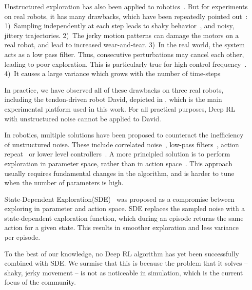 \documentclass{article}
\newcommand{\sde}{State-Dependent Exploration\xspace}
\newcommand{\SDE}{\textsc{SDE}\xspace}
\begin{document}
Unstructured exploration has also been applied to robotics~\citep{haarnoja2018applications, kendall2019learning}.
But for experiments on real robots, it has many drawbacks, which have been repeatedly pointed out~\citep{ruckstiess2008state, kober2009policy, ruckstiess2010exploring, stulp2013robot, deisenroth2013survey}:
1)~Sampling independently at each step leads to shaky behavior~\citep{mysore2021caps}, and noisy, jittery trajectories.
2)~The jerky motion patterns can damage the motors on a real robot, and lead to increased wear-and-tear.
3)~In the real world, the system acts as a low pass filter. Thus, consecutive perturbations may cancel each other, leading to poor exploration. This is particularly true for high control frequency~\citep{korenkevych2019autoregressive}.
4)~It causes a large variance which grows with the number of time-steps~\citep{kober2009policy, ruckstiess2010exploring, stulp2013robot}

In practice, we have observed all of these drawbacks on three real robots, including the tendon-driven robot David, depicted in , which is the main experimental platform used in this work.
For all practical purposes, Deep RL with unstructured noise cannot be applied to David.

In robotics, multiple solutions have been proposed to counteract the inefficiency of unstructured noise.
These include correlated noise~\citep{haarnoja2018applications, korenkevych2019autoregressive}, low-pass filters~\citep{haarnoja2018learning, ha2020learning}, action repeat~\citep{neunert2020continuous} or lower level controllers~\citep{haarnoja2018learning, kendall2019learning}.
A more principled solution is to perform exploration in parameter space, rather than in action space~\citep{plappert2017parameter, pourchot2018cem}. This approach usually requires fundamental changes in the algorithm, and is harder to tune when the number of parameters is high.

\sde (\SDE)~\citep{ruckstiess2008state, ruckstiess2010exploring} was proposed as a compromise between exploring in parameter and action space. \SDE replaces the sampled noise with a state-dependent exploration function, which during an episode returns the same action for a given state. This results in smoother exploration and less variance per episode.

To the best of our knowledge, no Deep RL algorithm has yet been successfully combined with \SDE. We surmise that this is because the problem that it solves -- shaky, jerky movement -- is not as noticeable in simulation, which is the current focus of the community.
\end{document}
